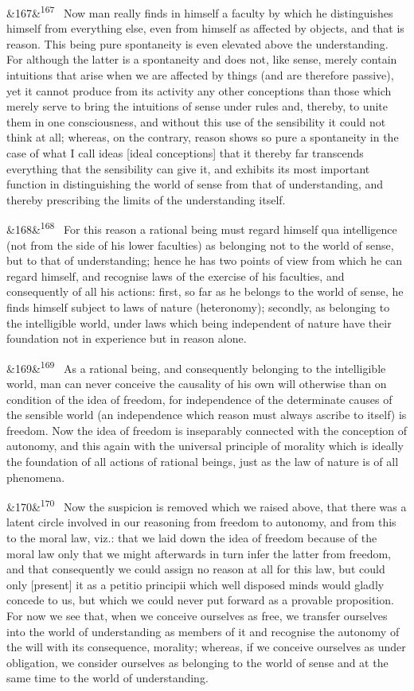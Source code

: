 \documentclass[12pt]{article}
\newcommand{\para}[1][]{\par\noindent\ifx&#1&\else\textsuperscript{\footnotesize #1}~\fi}
\begin{document}
\para[167] Now man really finds in himself a faculty by which he distinguishes himself from everything else, even from himself as affected by objects, and that is reason. This being pure spontaneity is even elevated above the understanding. For although the latter is a spontaneity and does not, like sense, merely contain intuitions that arise when we are affected by things (and are therefore passive), yet it cannot produce from its activity any other conceptions than those which merely serve to bring the intuitions of sense under rules and, thereby, to unite them in one consciousness, and without this use of the sensibility it could not think at all; whereas, on the contrary, reason shows so pure a spontaneity in the case of what I call ideas [ideal conceptions] that it thereby far transcends everything that the sensibility can give it, and exhibits its most important function in distinguishing the world of sense from that of understanding, and thereby prescribing the limits of the understanding itself.

\para[168] For this reason a rational being must regard himself qua intelligence (not from the side of his lower faculties) as belonging not to the world of sense, but to that of understanding; hence he has two points of view from which he can regard himself, and recognise laws of the exercise of his faculties, and consequently of all his actions: first, so far as he belongs to the world of sense, he finds himself subject to laws of nature (heteronomy); secondly, as belonging to the intelligible world, under laws which being independent of nature have their foundation not in experience but in reason alone.

\para[169] As a rational being, and consequently belonging to the intelligible world, man can never conceive the causality of his own will otherwise than on condition of the idea of freedom, for independence of the determinate causes of the sensible world (an independence which reason must always ascribe to itself) is freedom. Now the idea of freedom is inseparably connected with the conception of autonomy, and this again with the universal principle of morality which is ideally the foundation of all actions of rational beings, just as the law of nature is of all phenomena.

\para[170] Now the suspicion is removed which we raised above, that there was a latent circle involved in our reasoning from freedom to autonomy, and from this to the moral law, viz.: that we laid down the idea of freedom because of the moral law only that we might afterwards in turn infer the latter from freedom, and that consequently we could assign no reason at all for this law, but could only [present] it as a petitio principii which well disposed minds would gladly concede to us, but which we could never put forward as a provable proposition. For now we see that, when we conceive ourselves as free, we transfer ourselves into the world of understanding as members of it and recognise the autonomy of the will with its consequence, morality; whereas, if we conceive ourselves as under obligation, we consider ourselves as belonging to the world of sense and at the same time to the world of understanding.
\end{document}
